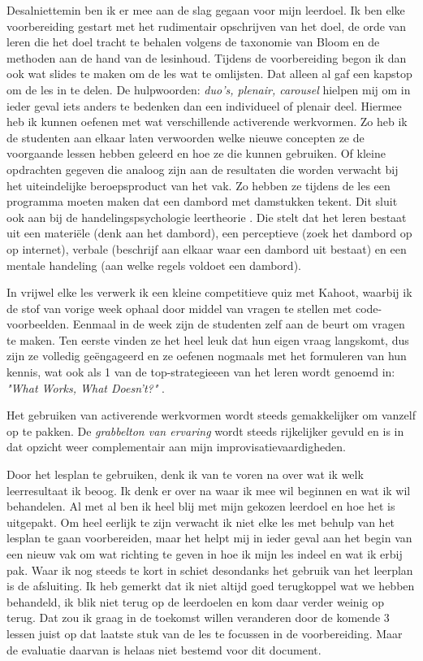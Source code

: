Desalniettemin ben ik er mee aan de slag gegaan voor mijn leerdoel. Ik ben elke voorbereiding gestart met het rudimentair opschrijven van het doel, de orde van leren die het doel tracht te behalen volgens de taxonomie van Bloom en de methoden aan de hand van de lesinhoud. Tijdens de voorbereiding begon ik dan ook wat slides te maken om de les wat te omlijsten. Dat alleen al gaf een kapstop om de les in te delen. De hulpwoorden: \textit{duo's, plenair, carousel} hielpen mij om in ieder geval iets anders te bedenken dan een individueel of plenair deel. Hiermee heb ik kunnen oefenen met wat verschillende activerende werkvormen. Zo heb ik de studenten aan elkaar laten verwoorden welke nieuwe concepten ze de voorgaande lessen hebben geleerd en hoe ze die kunnen gebruiken. Of kleine opdrachten gegeven die analoog zijn aan de resultaten die worden verwacht bij het uiteindelijke beroepsproduct van het vak. Zo hebben ze tijdens de les een programma moeten maken dat een dambord met damstukken tekent. Dit sluit ook aan bij de handelingspsychologie leertheorie \cite[p.417]{kallenberg2014leren}. Die stelt dat het leren bestaat uit een materiële (denk aan het dambord), een perceptieve (zoek het dambord op op internet), verbale (beschrijf aan elkaar waar een dambord uit bestaat) en een mentale handeling (aan welke regels voldoet een dambord). 

In vrijwel elke les verwerk ik een kleine competitieve quiz met Kahoot, waarbij ik de stof van vorige week ophaal door middel van vragen te stellen met code-voorbeelden. Eenmaal in de week zijn de studenten zelf aan de beurt om vragen te maken. Ten eerste vinden ze het heel leuk dat hun eigen vraag langskomt, dus zijn ze volledig geëngageerd en ze oefenen nogmaals met het formuleren van hun kennis, wat ook als 1 van de top-strategieeen van het leren wordt genoemd in: \textit{"What Works, What Doesn't?"} \cite{dunlosky2013}.

Het gebruiken van activerende werkvormen wordt steeds gemakkelijker om vanzelf op te pakken. De \textit{grabbelton van ervaring} wordt steeds rijkelijker gevuld en is in dat opzicht weer complementair aan mijn improvisatievaardigheden.

Door het lesplan te gebruiken, denk ik van te voren na over wat ik welk leerresultaat ik beoog. Ik denk er over na waar ik mee wil beginnen en wat ik wil behandelen. Al met al ben ik heel blij met mijn gekozen leerdoel en hoe het is uitgepakt. Om heel eerlijk te zijn verwacht ik niet elke les met behulp van het lesplan te gaan voorbereiden, maar het helpt mij in ieder geval aan het begin van een nieuw vak om wat richting te geven in hoe ik mijn les indeel en wat ik erbij pak.
Waar ik nog steeds te kort in schiet desondanks het gebruik van het leerplan is de afsluiting. Ik heb gemerkt dat ik niet altijd goed terugkoppel wat we hebben behandeld, ik blik niet terug op de leerdoelen en kom daar verder weinig op terug. Dat zou ik graag in de toekomst willen veranderen door de komende 3 lessen juist op dat laatste stuk van de les te focussen in de voorbereiding. Maar de evaluatie daarvan is helaas niet bestemd voor dit document.


